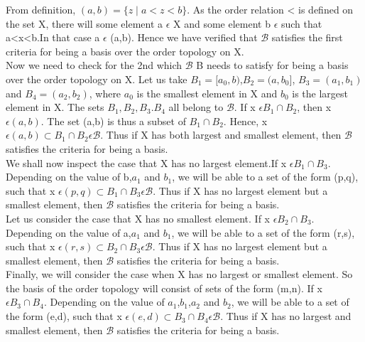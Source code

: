 \documentclass[a4paper,english,12pt]{article}
\begin{document}
\begin{flushleft}
\vspace{1mm}
From definition, $(a,b)=\{z\mid a<z<b\}$. As the order relation < is defined on the set X, there will some element a $\epsilon$ X and some element b $\epsilon$ such that a<x<b.In that case a $\epsilon$ (a,b). Hence we have verified that $\mathscr{B}$ satisfies the first criteria for being a basis over the order topology on X.\\
Now we need to check for the 2nd  which $\mathscr{B}$ B needs to satisfy for being a basis over the order topology on X. Let us take $B_1=[a_0,b)$,$B_2=(a,b_0]$, $B_3=(a_1,b_1)$ and $B_4=(a_2,b_2)$, where $a_0$ is the smallest element in X and $b_0$ is the largest element in X. The sets $B_1,B_2,B_3.B_4$ all belong to $\mathscr{B}$.
If x $\epsilon B_1 \cap B_2$, then x $\epsilon (a,b)$. The set (a,b) is thus a subset of $B_1 \cap B_2$. Hence, x $\epsilon (a,b) \subset B_1 \cap B_2 \epsilon \mathscr{B}$. Thus if X has both largest and smallest element, then $\mathscr{B}$ satisfies the criteria for being a basis.\\
\vspace{1mm}
We shall now inspect the case that X has no largest element.If x $\epsilon B_1 \cap B_3$. Depending on the value of b,$a_1$ and $b_1$, we will be able to a set of the form (p,q), such that  x $\epsilon (p,q) \subset B_1 \cap B_3 \epsilon \mathscr{B}$. Thus if X has no largest element but a smallest element, then $\mathscr{B}$ satisfies the criteria for being a basis.\\
\vspace{1mm}
Let us consider the case that X has no smallest element. If x $\epsilon B_2 \cap B_3$. Depending on the value of a,$a_1$ and $b_1$, we will be able to a set of the form (r,s), such that  x $\epsilon (r,s) \subset B_2 \cap B_3 \epsilon \mathscr{B}$. Thus if X has no largest element but a smallest element, then $\mathscr{B}$ satisfies the criteria for being a basis.\\
\vspace{1mm}
Finally, we will consider the case when X has no largest or smallest element. So the basis of the order topology will consist of sets of the form (m,n). If x $\epsilon B_3 \cap B_4$. Depending on the value of $a_1$,$b_1$,$a_2$ and $b_2$, we will be able to a set of the form (e,d), such that  x $\epsilon (e,d) \subset B_3 \cap B_4 \epsilon \mathscr{B}$. Thus if X has no largest and smallest element, then $\mathscr{B}$ satisfies the criteria for being a basis.\\
\vspace{1mm}

\end{flushleft}
\end{document}
